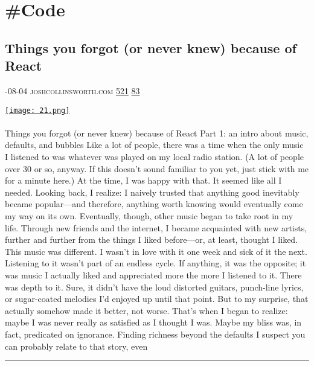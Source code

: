\documentclass[10pt,a4paper]{article}
\begin{document}
\newpage
\section{\#Code}

\begin{multicols*}{2}

\noindent\begin{minipage}{\linewidth}
\subsection{Things you forgot (or never knew) because of React}
\textsc{\footnotesize
{\scriptsize\faCalendar}-08-04 
{\scriptsize\faGlobe}\space 
joshcollinsworth.com 
{\scriptsize\faThumbsOUp}\space 
\href{http://news.ycombinator.com/item?id=37131802\&utm\_term=comment}{521} 
{\scriptsize\faComments}\space 
\href{http://news.ycombinator.com/item?id=37131802\&utm\_term=comment}{83} 
}
\par\medskip\noindent
\href{https://joshcollinsworth.com/blog/antiquated-react?utm\_source=hackernewsletter\&utm\_medium=email\&utm\_term=code}{
    \texttt{[image: 21.png]}
}
\end{minipage}
\paragraph{}
Things you forgot (or never knew) because of React
Part 1: an intro about music, defaults, and bubbles
Like a lot of people, there was a time when the only music I listened to was whatever was played on my local radio station. (A lot of people over 30 or so, anyway. If this doesn’t sound familiar to you yet, just stick with me for a minute here.) At the time, I was happy with that. It seemed like all I needed.
Looking back, I realize: I naively trusted that anything good inevitably became popular—and therefore, anything worth knowing would eventually come my way on its own.
Eventually, though, other music began to take root in my life. Through new friends and the internet, I became acquainted with new artists, further and further from the things I liked before—or, at least, thought I liked.
This music was different. I wasn’t in love with it one week and sick of it the next. Listening to it wasn’t part of an endless cycle.
If anything, it was the opposite; it was music I actually liked and appreciated more the more I listened to it. There was depth to it. Sure, it didn’t have the loud distorted guitars, punch-line lyrics, or sugar-coated melodies I’d enjoyed up until that point. But to my surprise, that actually somehow made it better, not worse.
That’s when I began to realize: maybe I was never really as satisfied as I thought I was.
Maybe my bliss was, in fact, predicated on ignorance.
Finding richness beyond the defaults
I suspect you can probably relate to that story, even
\par\noindent\textcolor{red}{\rule{\linewidth}{0.2mm}}
\vfill
\null
\noindent\begin{minipage}{\linewidth}

\end{minipage}
\end{multicols*}
\end{document}
